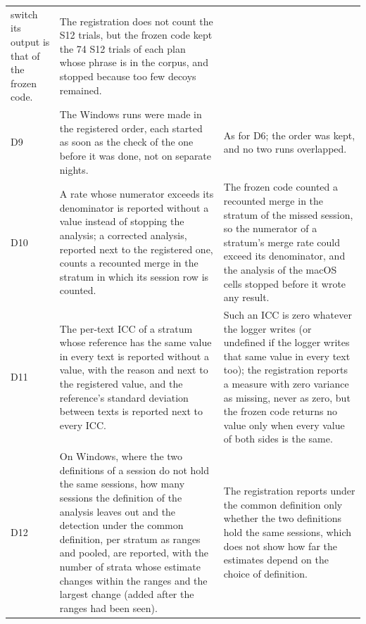 {\begin{longtable}{L{0.08}L{0.46}L{0.46}}
switch its output is that of the frozen code. &
The registration does not count the S12 trials, but the frozen code kept the 74 S12 trials of each plan whose phrase
is in the corpus, and stopped because too few decoys remained. \\
D9 & The Windows runs were made in the registered order, each started as soon as the check of the one before it was
done, not on separate nights. &
As for D6; the order was kept, and no two runs overlapped. \\
D10 & A rate whose numerator exceeds its denominator is reported without a value instead of stopping the analysis;
a corrected analysis, reported next to the registered one, counts a recounted merge in the stratum in which its
session row is counted. &
The frozen code counted a recounted merge in the stratum of the missed session, so the numerator of a stratum's
merge rate could exceed its denominator, and the analysis of the macOS cells stopped before it wrote any result. \\
D11 & The per-text ICC of a stratum whose reference has the same value in every text is reported without a value, with
the reason and next to the registered value, and the reference's standard deviation between texts is reported next to
every ICC. &
Such an ICC is zero whatever the logger writes (or undefined if the logger writes that same value in every text too); the
registration reports a measure with zero variance as missing, never as zero, but the frozen code returns no value only
when every value of both sides is the same. \\
D12 & On Windows, where the two definitions of a session do not hold the same sessions, how many sessions the
definition of the analysis leaves out and the detection under the common definition, per stratum as ranges and pooled,
are reported, with the number of strata whose estimate changes within the ranges and the largest change (added after
the ranges had been seen). &
The registration reports under the common definition only whether the two definitions hold the same sessions, which
does not show how far the estimates depend on the choice of definition. \\
\bottomrule
\end{longtable}
}

